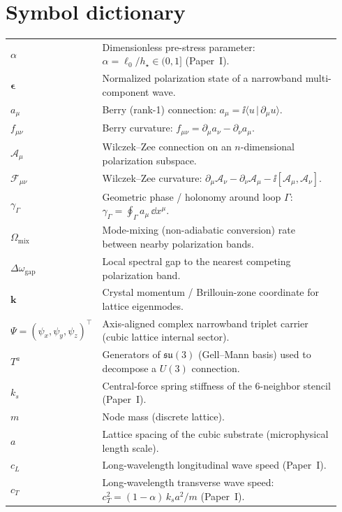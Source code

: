 \section[\appendixname~\thesection]{Symbol dictionary}
\label{sec:symbols}

\begin{center}
\begin{tabular}{p{0.22\linewidth} p{0.72\linewidth}}
$\alpha$ & Dimensionless pre-stress parameter: $\alpha=\ell_0/h_\star\in(0,1]$ (Paper~I).\\
$\bm{\epsilon}$ & Normalized polarization state of a narrowband multi-component wave.\\
$a_\mu$ & Berry (rank-1) connection: $a_\mu=\ii\langle u\,|\,\partial_\mu u\rangle$.\\
$f_{\mu\nu}$ & Berry curvature: $f_{\mu\nu}=\partial_\mu a_\nu-\partial_\nu a_\mu$.\\
$\mathcal{A}_\mu$ & Wilczek--Zee connection on an $n$-dimensional polarization subspace.\\
$\mathcal{F}_{\mu\nu}$ & Wilczek--Zee curvature: $\partial_\mu\mathcal{A}_\nu-\partial_\nu\mathcal{A}_\mu-\ii[\mathcal{A}_\mu,\mathcal{A}_\nu]$.\\
$\gamma_\Gamma$ & Geometric phase / holonomy around loop $\Gamma$: $\gamma_\Gamma=\oint_\Gamma a_\mu\,\dd x^\mu$.\\
$\Omega_{\mathrm{mix}}$ & Mode-mixing (non-adiabatic conversion) rate between nearby polarization bands.\\
$\Delta\omega_{\mathrm{gap}}$ & Local spectral gap to the nearest competing polarization band.\\
$\mathbf{k}$ & Crystal momentum / Brillouin-zone coordinate for lattice eigenmodes.\\
$\Psi=(\psi_x,\psi_y,\psi_z)^\top$ & Axis-aligned complex narrowband triplet carrier (cubic lattice internal sector).\\
$T^a$ & Generators of $\mathfrak{su}(3)$ (Gell--Mann basis) used to decompose a $U(3)$ connection.\\
$k_s$ & Central-force spring stiffness of the 6-neighbor stencil (Paper~I).\\
$m$ & Node mass (discrete lattice).\\
$a$ & Lattice spacing of the cubic substrate (microphysical length scale).\\
$c_L$ & Long-wavelength longitudinal wave speed (Paper~I).\\
$c_T$ & Long-wavelength transverse wave speed: $c_T^2=(1-\alpha)\,k_s a^2/m$ (Paper~I).\\
\end{tabular}
\end{center}

